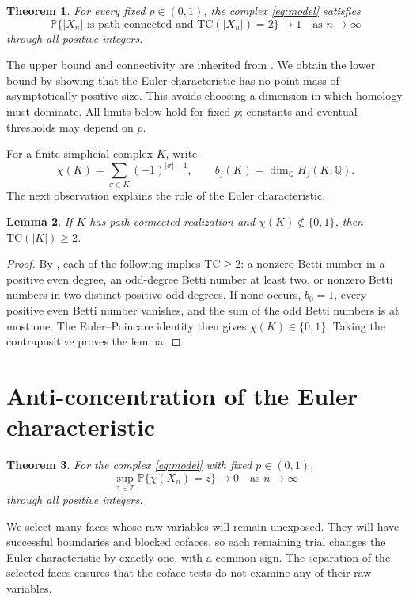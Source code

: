 \documentclass[11pt,a4paper]{article}
\newtheorem{theorem}{Theorem}
\newtheorem{lemma}[theorem]{Lemma}
\newcommand{\Prob}{\mathbb P}
\newcommand{\TC}{\mathrm{TC}}
\begin{document}
\begin{theorem}\label{thm:main}
For every fixed $p\in(0,1)$, the complex \eqref{eq:model} satisfies
\[
\Prob\{|X_n|\text{ is path-connected and }\TC(|X_n|)=2\}
\longrightarrow1
\quad\text{as }n\longrightarrow\infty
\]
through all positive integers.
\end{theorem}

The upper bound and connectivity are inherited from \cite{BF2026}.
We obtain the lower bound by showing that the Euler characteristic has
no point mass of asymptotically positive size. This avoids choosing a
dimension in which homology must dominate. All limits below hold for
fixed $p$; constants and eventual thresholds may depend on $p$.

For a finite simplicial complex $K$, write
\[
\chi(K)=\sum_{\sigma\in K}(-1)^{|\sigma|-1},
\qquad b_j(K)=\dim_{\mathbb Q}H_j(K;\mathbb Q).
\]
The next observation explains the role of the Euler characteristic.

\begin{lemma}\label{lem:chi}
If $K$ has path-connected realization and $\chi(K)\notin\{0,1\}$, then
$\TC(|K|)\ge2$.
\end{lemma}
\begin{proof}
By \cite[Lemma~17]{BF2026}, each of the following implies $\TC\ge2$:
a nonzero Betti number in a positive even degree, an odd-degree Betti
number at least two, or nonzero Betti numbers in two distinct positive
odd degrees. If none occurs, $b_0=1$, every positive even Betti number
vanishes, and the sum of the odd Betti numbers is at most one.
The Euler--Poincare identity then gives $\chi(K)\in\{0,1\}$.
Taking the contrapositive proves the lemma.
\end{proof}

\section{Anti-concentration of the Euler characteristic}

\begin{theorem}\label{thm:atoms}
For the complex \eqref{eq:model} with fixed $p\in(0,1)$,
\begin{equation}\label{eq:atoms}
\sup_{z\in\mathbb Z}\Prob\{\chi(X_n)=z\}\longrightarrow0
\quad\text{as }n\longrightarrow\infty
\end{equation}
through all positive integers.
\end{theorem}

We select many faces whose raw variables will remain unexposed. They
will have successful boundaries and blocked cofaces, so each remaining
trial changes the Euler characteristic by exactly one, with a common sign.
The separation of the selected faces ensures that the coface tests do
not examine any of their raw variables.
\end{document}
